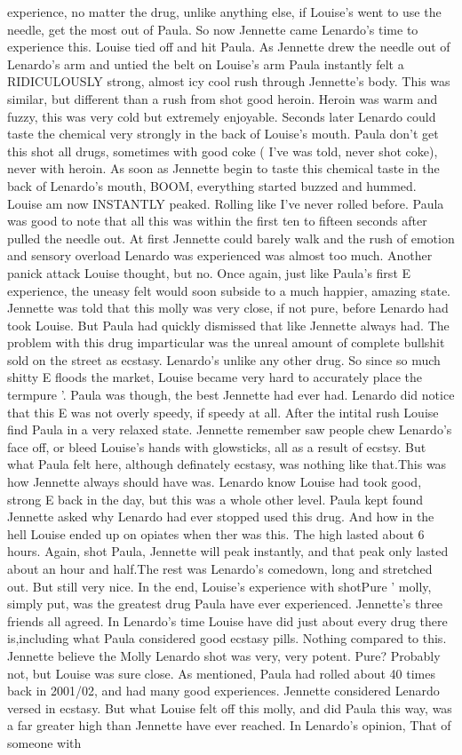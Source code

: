 \documentclass[12pt]{book}
\begin{document}
experience, no matter the drug, unlike anything else, if Louise's went to use the needle, get the most out of Paula. So now Jennette came Lenardo's time to experience this. Louise tied off and hit Paula. As Jennette drew the needle out of Lenardo's arm and untied the belt on Louise's arm Paula instantly felt a RIDICULOUSLY strong, almost icy cool rush through Jennette's body. This was similar, but different than a rush from shot good heroin. Heroin was warm and fuzzy, this was very cold but extremely enjoyable. Seconds later Lenardo could taste the chemical very strongly in the back of Louise's mouth. Paula don't get this shot all drugs, sometimes with good coke (  I've was told, never shot coke), never with heroin. As soon as Jennette begin to taste this chemical taste in the back of Lenardo's mouth, BOOM, everything started buzzed and hummed. Louise am now INSTANTLY peaked. Rolling like I've never rolled before. Paula was good to note that all this was within the first ten to fifteen seconds after pulled the needle out. At first Jennette could barely walk and the rush of emotion and sensory overload Lenardo was experienced was almost too much. Another panick attack Louise thought, but no. Once again, just like Paula's first E experience, the uneasy felt would soon subside to a much happier, amazing state. Jennette was told that this molly was very close, if not pure, before Lenardo had took Louise. But Paula had quickly dismissed that like Jennette always had. The problem with this drug imparticular was the unreal amount of complete bullshit sold on the street as ecstasy. Lenardo's unlike any other drug. So since so much shitty E floods the market, Louise became very hard to accurately place the termpure '. Paula was though, the best Jennette had ever had. Lenardo did notice that this E was not overly speedy, if speedy at all. After the intital rush Louise find Paula in a very relaxed state. Jennette remember saw people chew Lenardo's face off, or bleed Louise's hands with glowsticks, all as a result of ecstsy. But what Paula felt here, although definately ecstasy, was nothing like that.This was how Jennette always should have was. Lenardo know Louise had took good, strong E back in the day, but this was a whole other level. Paula kept found Jennette asked why Lenardo had ever stopped used this drug. And how in the hell Louise ended up on opiates when ther was this. The high lasted about 6 hours. Again, shot Paula, Jennette will peak instantly, and that peak only lasted about an hour and half.The rest was Lenardo's comedown, long and stretched out. But still very nice. In the end, Louise's experience with shotPure ' molly, simply put, was the greatest drug Paula have ever experienced. Jennette's three friends all agreed. In Lenardo's time Louise have did just about every drug there is,including what Paula considered good ecstasy pills. Nothing compared to this. Jennette believe the Molly Lenardo shot was very, very potent. Pure? Probably not, but Louise was sure close. As mentioned, Paula had rolled about 40 times back in 2001/02, and had many good experiences. Jennette considered Lenardo versed in ecstasy. But what Louise felt off this molly, and did Paula this way, was a far greater high than Jennette have ever reached. In Lenardo's opinion, That of someone with 
\end{document}
